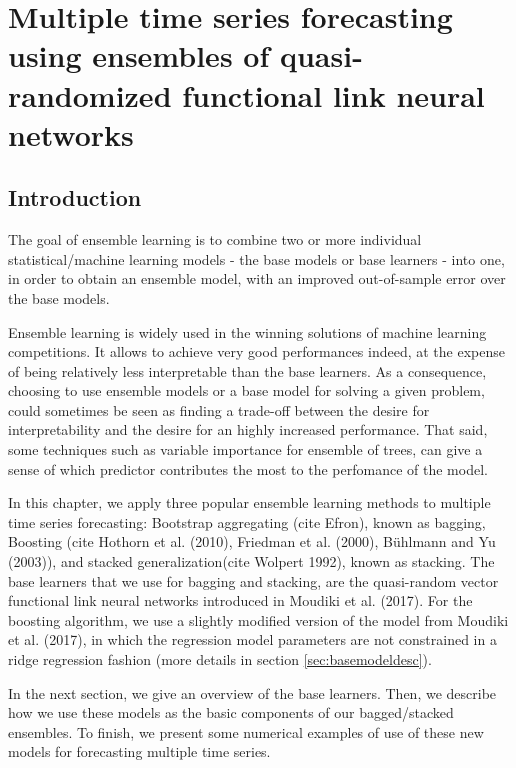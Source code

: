 %
\chapter{Multiple time series forecasting using ensembles of quasi-randomized functional link neural networks}
\label{sec:rvfl_ensembles}

\section{Introduction}

The goal of ensemble learning is to combine two or more individual statistical/machine learning models - the base models or base learners - into one, in order to obtain an ensemble model, with an improved out-of-sample error over the base models.

\medskip

Ensemble learning is widely used in the winning solutions of machine learning competitions. It allows to achieve very good performances indeed, at the expense of being relatively less interpretable than the base learners. As a consequence, choosing to use ensemble models or a base model for solving a given problem, could sometimes be seen as finding a trade-off between the desire for interpretability and the desire for an highly increased performance. That said, some techniques such as variable importance for ensemble of trees, can give a sense of which predictor contributes the most to the perfomance of the model.

\medskip

In this chapter, we apply three popular ensemble learning methods to multiple time series forecasting: Bootstrap aggregating (cite Efron), known as bagging, Boosting (cite Hothorn et al. (2010), Friedman et al. (2000), Bühlmann and Yu (2003)), and stacked generalization(cite Wolpert 1992), known as stacking. The base learners that we use for bagging and stacking, are the quasi-random vector functional link neural networks introduced in Moudiki et al. (2017). For the boosting algorithm, we use a slightly modified version of the model from Moudiki et al. (2017), in which the regression model parameters are not constrained in a ridge regression fashion (more details in section \ref{sec:basemodeldesc}).  

\medskip

In the next section, we give an overview of the base learners. Then, we describe how we use these models as the basic components of our bagged/stacked ensembles. To finish, we present some numerical examples of use of these new models for forecasting multiple time series.

